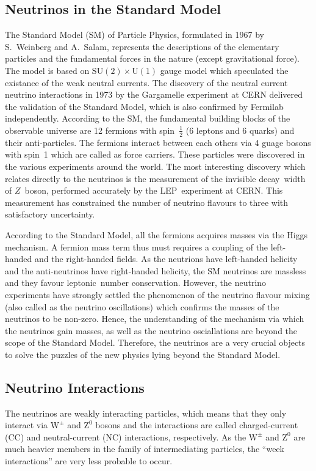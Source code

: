 \subsection{Neutrinos in the Standard Model}
The Standard Model (SM) of Particle Physics, formulated in 1967 by S.~Weinberg and A.~Salam, represents the descriptions of the elementary particles and the fundamental forces in the nature (except gravitational force)\cite{weinberg1967,abdus1968}.
The model is based on $\text{SU}\left(2\right)\times\text{U}\left(1\right)$ gauge model which speculated the existance of the weak neutral currents\cite{glashow1961}.
The discovery of the neutral current neutrino interactions in 1973 by the Gargamelle experiment at CERN delivered the validation of the Standard Model\cite{hasert1973,hasert1973_1,hasert1974}, which is also confirmed by Fermilab independently\cite{benvenuti1974}.
According to the SM, the fundamental building blocks of the observable universe are 12 fermions with spin~$\frac{1}{2}$ (6 leptons and 6 quarks) and their anti-particles.
The fermions interact between each others via 4 guage bosons with spin~1 which are called as force carriers. These particles were discovered in the various experiments around the world.
The most interesting discovery which relates directly to the neutrinos is the measurement of the invisible decay~width of $Z$~boson, performed accurately by the LEP~experiment at CERN\cite{numberneut}. This measurement has constrained the number of neutrino flavours to three with satisfactory uncertainty.

According to the Standard Model, all the fermions acquires masses via the Higgs mechanism.
A fermion mass term thus must requires a coupling of the left-handed and the right-handed fields.
As the neutrions have left-handed helicity and the anti-neutrinos have right-handed helicity, the SM neutrinos are massless and they favour leptonic~number conservation.
However, the neutrino experiments have strongly settled the phenomenon of the neutrino flavour mixing (also called as the neutrino oscillations) which confirms the masses of the neutrinos to be non-zero.
Hence, the understanding of the mechanism via which the neutrinos gain masses, as well as the neutrino osciallations are beyond the scope of the Standard Model.
Therefore, the neutrinos are a very crucial objects to solve the puzzles of the new physics lying beyond the Standard Model.


\subsection{Neutrino Interactions}
The neutrinos are weakly interacting particles, which means that they only interact via $\mathrm{W}^{\pm}$ and $\mathrm{Z}^{0}$ bosons and the interactions are called charged-current (CC) and neutral-current (NC) interactions, respectively. As the $\mathrm{W}^{\pm}$ and $\mathrm{Z}^{0}$ are much heavier members in the family of intermediating particles, the ``week interactions'' are very less probable to occur.

